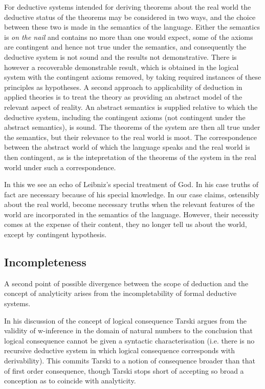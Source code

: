 \documentclass[numreferences]{rbjk}
\begin{document}
\begin{article}
{For deductive systems intended for deriving theorems about the real world the deductive status of the theorems may be considered in two ways, and the choice between these two is made in the semantics of the language.
Either the semantics is {\it on the nail} and contains no more than one would expect, some of the axioms are contingent and hence not true under the semantics, and consequently the deductive system is not sound and the results not demonstrative.
There is however a recoverable demonstrable result, which is obtained in the logical system with the contingent axioms removed, by taking required instances of these principles as hypotheses.
A second approach to applicability of deduction in applied theories is to treat the theory as providing an abstract model of the relevant aspect of reality.
An abstract semantics is supplied relative to which the deductive system, including the contingent axioms (not contingent under the abstract semantics), is sound.
The theorems of the system are then all true under the semantics, but their relevance to the real world is moot.
The correspondence between the abstract world of which the language speaks and the real world is then contingent, as is the intepretation of the theorems of the system in the real world under such a correspondence.

In this we see an echo of Leibniz's special treatment of God.
In his case truths of fact are necessary because of his special knowledge.
In our case claims, ostensibly about the real world, become necessary truths when the relevant features of the world are incorporated in the semantics of the language.
However, their necessity comes at the expense of their content, they no longer tell us about the world, except by contingent hypothesis.

\subsection{Incompleteness}

A second point of possible divergence between the scope of deduction and the concept of analyticity arises from the incompletability of formal deductive systems.

In his discussion of the concept of logical consequence \cite{Tarski36} Tarski argues from the validity of w-inference in the domain of natural numbers to the conclusion that logical consequence cannot be given a syntactic characterisation (i.e. there is no recursive deductive system in which logical consequence corresponds with derivability).
This commits Tarski to a notion of consequence broader than that of first order consequence, though Tarski stops short of accepting so broad a conception as to coincide with analyticity.

}
\end{article}
\end{document}
